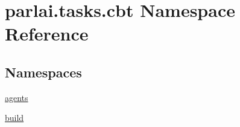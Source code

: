 \hypertarget{namespaceparlai_1_1tasks_1_1cbt}{}\section{parlai.\+tasks.\+cbt Namespace Reference}
\label{namespaceparlai_1_1tasks_1_1cbt}
\subsection*{Namespaces}
\begin{DoxyCompactItemize}
\item 
 \hyperlink{namespaceparlai_1_1tasks_1_1cbt_1_1agents}{agents}
\item 
 \hyperlink{namespaceparlai_1_1tasks_1_1cbt_1_1build}{build}
\end{DoxyCompactItemize}
